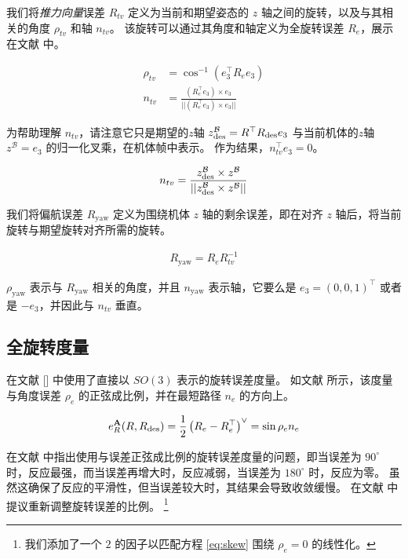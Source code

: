 \documentclass[conference]{IEEEtran}
\begin{document}
我们将\textit{推力向量}误差 $R_{tv}$ 定义为当前和期望姿态的 $z$ 轴之间的旋转，以及与其相关的角度 $\rho_{tv}$ 和轴 $n_{tv}$。
该旋转可以通过其角度和轴定义为全旋转误差 $R_e$，展示在文献 \citep{mueller_multicopter_2018} 中。

\begin{align}
  \rho_{tv} &= \cos^{-1}(e_3^\top R_e e_3) \\
  n_{tv} &= \frac{(R_e^\top e_3) \times e_3 }{|| (R_e^\top e_3) \times e_3 || }
\end{align}

为帮助理解 $n_{tv}$，请注意它只是期望的$z$轴 $z_{\text{des}}^{\mathcal{B}} = R^\top R_{\text{des}} e_3$ 与当前机体的$z$轴 $z^{\mathcal{B}} = e_3$ 的归一化叉乘，在机体帧中表示。
作为结果，$n_{tv}^\top e_3 = 0$。

\begin{align}
  n_{tv} = \frac{
                  z_{\text{des}}^{\mathcal{B}} \times z^{\mathcal{B}}
                }
                { ||
                  z_{\text{des}}^{\mathcal{B}} \times z^{\mathcal{B}}
                || }
\end{align}

我们将偏航误差 $R_{\text{yaw}}$ 定义为围绕机体 $z$ 轴的剩余误差，即在对齐 $z$ 轴后，将当前旋转与期望旋转对齐所需的旋转。

\begin{align}
  R_{\text{yaw}} = R_e R_{tv}^{-1}
\end{align}

$\rho_{\text{yaw}}$ 表示与 $R_{\text{yaw}}$ 相关的角度，并且 $n_{\text{yaw}}$ 表示轴，它要么是 $e_3 = (0, 0, 1)^\top$ 或者是 $-e_3$，并因此与 $n_{tv}$ 垂直。
\subsection{全旋转度量}

在文献 [] 中使用了直接以 $SO(3)$ 表示的旋转误差度量。
如文献 \cite{mueller_multicopter_2018} 所示，该度量与角度误差 $\rho_e$ 的正弦成比例，并在最短路径 $n_e$ 的方向上。

\begin{align}
  \label{eq:skew}
  e_R^{\textbf{A}}(R, \Rdes) = \frac12\left(R_e - R_e^\top\right)^\vee = \sin\rho_e n_e
\end{align}

在文献 \citet{lee_exponential_2012} 中指出使用与误差正弦成比例的旋转误差度量的问题，即当误差为 $90^\circ$ 时，反应最强，而当误差再增大时，反应减弱，当误差为 $180^\circ$ 时，反应为零。 
虽然这确保了反应的平滑性，但当误差较大时，其结果会导致收敛缓慢。
在文献 \citet{lee_exponential_2012} 中提议重新调整旋转误差的比例。 \footnote{我们添加了一个 $2$ 的因子以匹配方程 \eqref{eq:skew} 围绕 $\rho_e = 0$ 的线性化。}
\end{document}
